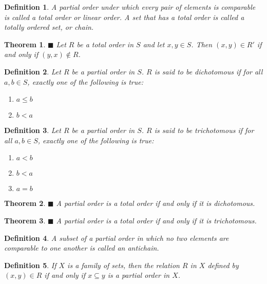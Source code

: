 \documentclass[a4paper]{article}
\newtheorem{mytheorem}{Theorem}
\newtheorem{mydef}{Definition}
\numberwithin{mytheorem}{section}
\numberwithin{mydef}{section}
\numberwithin{axiom}{section}
\numberwithin{example}{section}
\newcommand{\done}{$\blacksquare$ }
\begin{document}
\begin{mydef} A partial order under which every pair of elements is comparable is called a total order or linear order. A set that has a total order is called a totally ordered set, or chain.  
\end{mydef}

\begin{mytheorem} \done Let $R$ be a total order in $S$ and let $x,y \in S$. Then $(x,y) \in R'$ if and only if $(y,x) \notin R$. 
\end{mytheorem}

\begin{mydef} Let $R$ be a partial order in $S$. $R$ is said to be dichotomous if for all $a,b \in S$, exactly one of the following is true: 
 \begin{enumerate}
 \item $a \leq b$
 \item $b < a$
 \end{enumerate}
\end{mydef}

\begin{mydef} Let $R$ be a partial order in $S$. $R$ is said to be trichotomous if for all $a,b \in S$, exactly one of the following is true: 
 \begin{enumerate}
 \item $a < b$
 \item $b < a$
 \item $a = b$
 \end{enumerate}
\end{mydef}

\begin{mytheorem} \done A partial order is a total order if and only if it is dichotomous.
\end{mytheorem}

\begin{mytheorem} \done A partial order is a total order if and only if it is trichotomous.
\end{mytheorem}

\begin{mydef} A subset of a partial order in which no two elements are comparable to one another is called an antichain.
\end{mydef}

\begin{mydef} If $X$ is a family of sets, then the relation $R$ in $X$ defined by $(x,y) \in R$ if and only if $x \subseteq y$ is a partial order in $X$.
\end{mydef}
\end{document}

